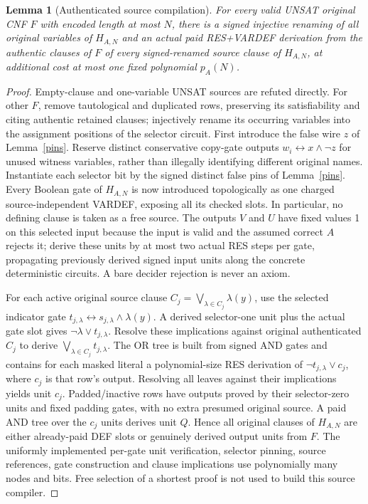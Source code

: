 \documentclass[11pt]{article}
\newtheorem{lemma}[theorem]{Lemma}
\begin{document}
\begin{lemma}[Authenticated source compilation]\label{compiler}
For every valid UNSAT original CNF \(F\) with encoded length at most \(N\), there is a signed injective renaming of all original variables of \(H_{A,N}\) and an actual paid RES+VARDEF derivation from the authentic clauses of \(F\) of every signed-renamed source clause of \(H_{A,N}\), at additional cost at most one fixed polynomial \(p_A(N)\).
\end{lemma}
\begin{proof}
Empty-clause and one-variable UNSAT sources are refuted directly. For other \(F\), remove tautological and duplicated rows, preserving its satisfiability and citing authentic retained clauses; injectively rename its occurring variables into the assignment positions of the selector circuit. First introduce the false wire \(z\) of Lemma~\ref{pins}. Reserve distinct conservative copy-gate outputs \(w_i\leftrightarrow x\land\neg z\) for unused witness variables, rather than illegally identifying different original names. Instantiate each selector bit by the signed distinct false pins of Lemma~\ref{pins}. Every Boolean gate of \(H_{A,N}\) is now introduced topologically as one charged source-independent VARDEF, exposing all its checked slots. In particular, no defining clause is taken as a free source. The outputs \(V\) and \(U\) have fixed values 1 on this selected input because the input is valid and the assumed correct \(A\) rejects it; derive these units by at most two actual RES steps per gate, propagating previously derived signed input units along the concrete deterministic circuits. A bare decider rejection is never an axiom.

For each active original source clause \(C_j=\bigvee_{\lambda\in C_j}\lambda(y)\), use the selected indicator gate \(t_{j,\lambda}\leftrightarrow s_{j,\lambda}\land\lambda(y)\). A derived selector-one unit plus the actual gate slot gives \(\neg\lambda\vee t_{j,\lambda}\). Resolve these implications against original authenticated \(C_j\) to derive \(\bigvee_{\lambda\in C_j}t_{j,\lambda}\). The OR tree is built from signed AND gates and contains for each masked literal a polynomial-size RES derivation of \(\neg t_{j,\lambda}\vee c_j\), where \(c_j\) is that row's output. Resolving all leaves against their implications yields unit \(c_j\). Padded/inactive rows have outputs proved by their selector-zero units and fixed padding gates, with no extra presumed original source. A paid AND tree over the \(c_j\) units derives unit \(Q\). Hence all original clauses of \(H_{A,N}\) are either already-paid DEF slots or genuinely derived output units from \(F\). The uniformly implemented per-gate unit verification, selector pinning, source references, gate construction and clause implications use polynomially many nodes and bits. Free selection of a shortest proof is not used to build this source compiler.
\end{proof}
\end{document}
